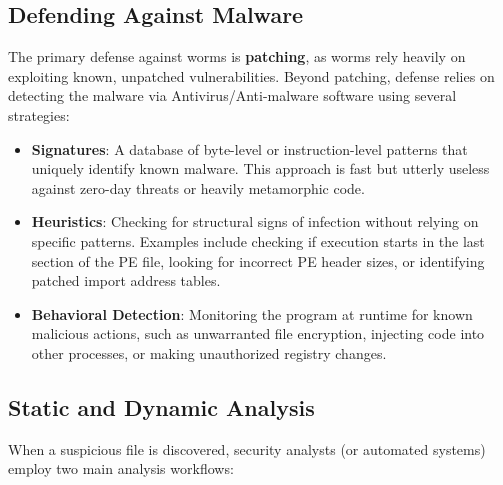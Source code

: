 \subsection{Defending Against Malware}
The primary defense against worms is \textbf{patching}, as worms rely heavily on exploiting known, unpatched vulnerabilities. Beyond patching, defense relies on detecting the malware via Antivirus/Anti-malware software using several strategies:
\begin{itemize}
    \item \textbf{Signatures}: A database of byte-level or instruction-level patterns that uniquely identify known malware. This approach is fast but utterly useless against zero-day threats or heavily metamorphic code.
    \item \textbf{Heuristics}: Checking for structural signs of infection without relying on specific patterns. Examples include checking if execution starts in the last section of the PE file, looking for incorrect PE header sizes, or identifying patched import address tables.
    \item \textbf{Behavioral Detection}: Monitoring the program at runtime for known malicious actions, such as unwarranted file encryption, injecting code into other processes, or making unauthorized registry changes.
\end{itemize}

\subsection{Static and Dynamic Analysis}
When a suspicious file is discovered, security analysts (or automated systems) employ two main analysis workflows:

